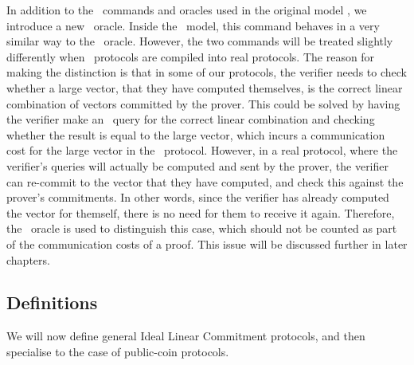 In addition to the \ILC\ commands and oracles used in the original model \cite{BootleCGGHJ17}, we introduce a new \ILCcheck\ oracle. Inside the \ILC \ model, this command behaves in a very similar way to the \ILCopen\ oracle. However, the two commands will be treated slightly differently when \ILC\ protocols are compiled into real protocols. The reason for making the distinction is that in some of our protocols, the verifier needs to check whether a large vector, that they have computed themselves, is the correct linear combination of vectors committed by the prover. This could be solved by having the verifier make an \ILCsend\ query for the correct linear combination and checking whether the result is equal to the large vector, which incurs a communication cost for the large vector in the \ILC\ protocol. However, in a real protocol, where the verifier's queries will actually be computed and sent by the prover, the verifier can re-commit to the vector that they have computed, and check this against the prover's commitments. In other words, since the verifier has already computed the vector for themself, there is no need for them to receive it again. Therefore, the \ILCcheck\ oracle is used to distinguish this case, which should not be counted as part of the communication costs of a proof. This issue will be discussed further in later chapters.

\subsection{Definitions}

We will now define general Ideal Linear Commitment protocols, and then specialise to the case of public-coin protocols.

